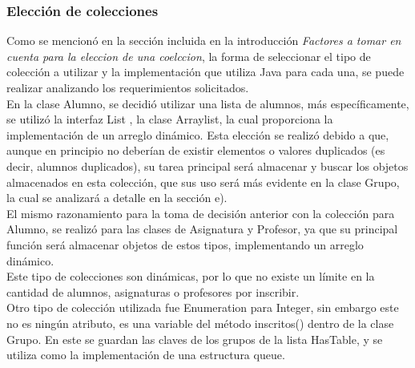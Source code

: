 \documentclass[12pt]{report}
\begin{document}
    


\subsubsection{Elección de colecciones}
Como se mencionó en la sección incluida en la introducción \textit{Factores a tomar en cuenta para la eleccion de una coelccion}, la forma de seleccionar el tipo de colección a utilizar y la implementación que utiliza Java para cada una, se puede realizar analizando los requerimientos solicitados.\\
En la clase Alumno, se decidió utilizar una lista de alumnos, más específicamente, se utilizó la interfaz List , la clase Arraylist, la cual proporciona la implementación de un arreglo dinámico. Esta elección se realizó debido a que, aunque en principio no deberían de existir elementos o valores duplicados (es decir, alumnos duplicados), su tarea principal será almacenar y buscar los objetos almacenados en esta colección, que sus uso será más evidente en la clase Grupo, la cual se analizará a detalle en la sección e). \\
El mismo razonamiento para la toma de decisión anterior con la colección para Alumno, se realizó para las clases de Asignatura y Profesor, ya que su principal función será almacenar objetos de estos tipos, implementando un arreglo dinámico.\\
Este tipo de colecciones son dinámicas, por lo que no existe un límite en la cantidad de alumnos, asignaturas o profesores por inscribir.\\
Otro tipo de colección utilizada fue Enumeration para Integer, sin embargo este no es ningún atributo, es una variable del método inscritos() dentro de la clase Grupo. En este se guardan las claves de los grupos de la lista HasTable, y se utiliza como la implementación de una estructura queue.





\end{document}
